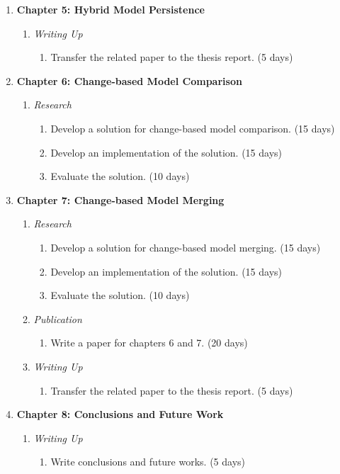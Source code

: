 \documentclass[12pt, a4paper]{report} \usepackage[titletoc]{appendix}
\begin{document}
\begin{enumerate}
\begin{enumerate}
    \end{enumerate}
    \item \textbf{Chapter 5: Hybrid Model Persistence}
    \begin{enumerate}
        \item \textit{Writing Up}
        \begin{enumerate}
            \item Transfer the related paper to the thesis report. (5 days)
        \end{enumerate}
    \end{enumerate}
    \item \textbf{Chapter 6: Change-based Model Comparison}
    \begin{enumerate}
        \item \textit{Research}
        \begin{enumerate}
            \item Develop a solution for change-based model comparison. (15 days)
            \item Develop an implementation of the solution. (15 days)
            \item Evaluate the solution. (10 days)
        \end{enumerate}
    \end{enumerate}
    \item \textbf{Chapter 7: Change-based Model Merging}
    \begin{enumerate}
        \item \textit{Research}
        \begin{enumerate}
            \item Develop a solution for change-based model merging. (15 days)
            \item Develop an implementation of the solution. (15 days)
            \item Evaluate the solution. (10 days)
        \end{enumerate}
        \item \textit{Publication}
        \begin{enumerate}
            \item Write a paper for chapters 6 and 7. (20 days)
        \end{enumerate}
        \item \textit{Writing Up}
        \begin{enumerate}
            \item Transfer the related paper to the thesis report. (5 days)
        \end{enumerate}
    \end{enumerate}
    \item \textbf{Chapter 8: Conclusions and Future Work}
    \begin{enumerate}
        \item \textit{Writing Up}
        \begin{enumerate}
            \item Write conclusions and future works. (5 days)
        \end{enumerate}
    \end{enumerate}
\end{enumerate}
\end{document}
